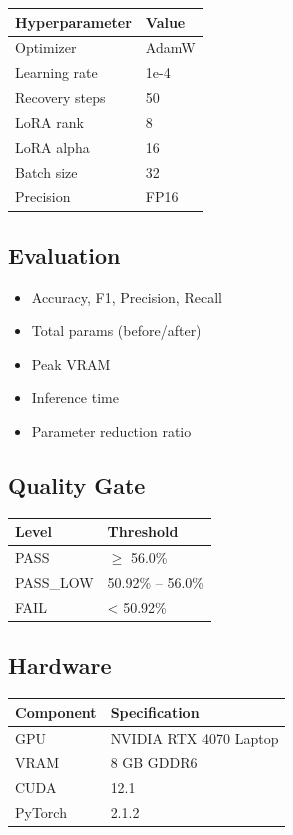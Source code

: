 \begin{table}[H]
\centering
\small
\begin{tabular}{ll}
\toprule
\textbf{Hyperparameter} & \textbf{Value} \\
\midrule
Optimizer & AdamW \\
Learning rate & 1e-4 \\
Recovery steps & 50 \\
LoRA rank & 8 \\
LoRA alpha & 16 \\
Batch size & 32 \\
Precision & FP16 \\
\bottomrule
\end{tabular}
\end{table}

\subsection{Evaluation}

\begin{itemize}
\item Accuracy, F1, Precision, Recall
\item Total params (before/after)
\item Peak VRAM
\item Inference time
\item Parameter reduction ratio

\end{itemize}
\subsection{Quality Gate}

\begin{table}[H]
\centering
\small
\begin{tabular}{ll}
\toprule
\textbf{Level} & \textbf{Threshold} \\
\midrule
PASS & $\ge$ 56.0\% \\
PASS\_LOW & 50.92\% -- 56.0\% \\
FAIL & < 50.92\% \\
\bottomrule
\end{tabular}
\end{table}

\subsection{Hardware}

\begin{table}[H]
\centering
\small
\begin{tabular}{ll}
\toprule
\textbf{Component} & \textbf{Specification} \\
\midrule
GPU & NVIDIA RTX 4070 Laptop \\
VRAM & 8 GB GDDR6 \\
CUDA & 12.1 \\
PyTorch & 2.1.2 \\
\bottomrule
\end{tabular}
\end{table}

